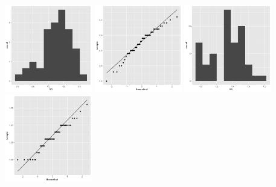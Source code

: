 \begin{center}
	\includegraphics[width=1.5in]{II_2_X3_hist.png}
	\includegraphics[width=1.5in]{II_2_X3_qq.png}
	\includegraphics[width=1.5in]{II_2_X4_hist.png}
	\includegraphics[width=1.5in]{II_2_X4_qq.png}
\end{center}
